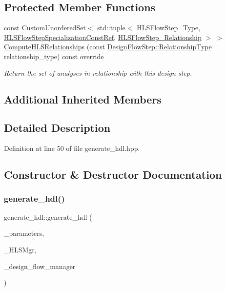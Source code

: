 \subsection*{Protected Member Functions}
\begin{DoxyCompactItemize}
\item 
const \hyperlink{classCustomUnorderedSet}{Custom\+Unordered\+Set}$<$ std\+::tuple$<$ \hyperlink{hls__step_8hpp_ada16bc22905016180e26fc7e39537f8d}{H\+L\+S\+Flow\+Step\+\_\+\+Type}, \hyperlink{hls__step_8hpp_a5fdd2edf290c196531d21d68e13f0e74}{H\+L\+S\+Flow\+Step\+Specialization\+Const\+Ref}, \hyperlink{hls__step_8hpp_a3ad360b9b11e6bf0683d5562a0ceb169}{H\+L\+S\+Flow\+Step\+\_\+\+Relationship} $>$ $>$ \hyperlink{classgenerate__hdl_a87b4ff40c6f91b64283253b1c1122c8f}{Compute\+H\+L\+S\+Relationships} (const \hyperlink{classDesignFlowStep_a723a3baf19ff2ceb77bc13e099d0b1b7}{Design\+Flow\+Step\+::\+Relationship\+Type} relationship\+\_\+type) const override
\begin{DoxyCompactList}\small\item\em Return the set of analyses in relationship with this design step. \end{DoxyCompactList}\end{DoxyCompactItemize}
\subsection*{Additional Inherited Members}


\subsection{Detailed Description}


Definition at line 50 of file generate\+\_\+hdl.\+hpp.



\subsection{Constructor \& Destructor Documentation}
\mbox{\label{classgenerate__hdl_aa156846721581846f1b6c593c212656b}} 
\subsubsection{\texorpdfstring{generate\+\_\+hdl()}{generate\_hdl()}}
{\footnotesize\ttfamily generate\+\_\+hdl\+::generate\+\_\+hdl (\begin{DoxyParamCaption}\item[{const \hyperlink{Parameter_8hpp_a37841774a6fcb479b597fdf8955eb4ea}{Parameter\+Const\+Ref}}]{\+\_\+parameters,  }\item[{const \hyperlink{hls__manager_8hpp_acd3842b8589fe52c08fc0b2fcc813bfe}{H\+L\+S\+\_\+manager\+Ref}}]{\+\_\+\+H\+L\+S\+Mgr,  }\item[{const Design\+Flow\+Manager\+Const\+Ref}]{\+\_\+design\+\_\+flow\+\_\+manager }\end{DoxyParamCaption})}




